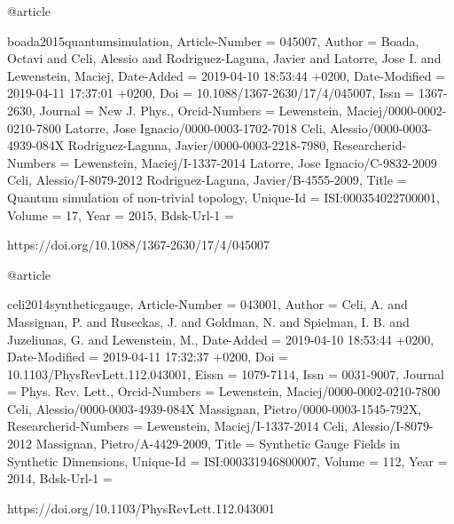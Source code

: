 \documentclass[epj,final]{svjour}
\begin{document}
{{{{{@article{boada2015quantumsimulation,
	Article-Number = {{045007}},
	Author = {Boada, Octavi and Celi, Alessio and Rodriguez-Laguna, Javier and Latorre, Jose I. and Lewenstein, Maciej},
	Date-Added = {2019-04-10 18:53:44 +0200},
	Date-Modified = {2019-04-11 17:37:01 +0200},
	Doi = {{10.1088/1367-2630/17/4/045007}},
	Issn = {{1367-2630}},
	Journal = {New J. Phys.},
	Orcid-Numbers = {{Lewenstein, Maciej/0000-0002-0210-7800 Latorre, Jose Ignacio/0000-0003-1702-7018 Celi, Alessio/0000-0003-4939-084X Rodriguez-Laguna, Javier/0000-0003-2218-7980}},
	Researcherid-Numbers = {{Lewenstein, Maciej/I-1337-2014 Latorre, Jose Ignacio/C-9832-2009 Celi, Alessio/I-8079-2012 Rodriguez-Laguna, Javier/B-4555-2009}},
	Title = {{Quantum simulation of non-trivial topology}},
	Unique-Id = {{ISI:000354022700001}},
	Volume = {{17}},
	Year = {{2015}},
	Bdsk-Url-1 = {https://doi.org/10.1088/1367-2630/17/4/045007

@article{celi2014syntheticgauge,
	Article-Number = {{043001}},
	Author = {Celi, A. and Massignan, P. and Ruseckas, J. and Goldman, N. and Spielman, I. B. and Juzeliunas, G. and Lewenstein, M.},
	Date-Added = {2019-04-10 18:53:44 +0200},
	Date-Modified = {2019-04-11 17:32:37 +0200},
	Doi = {{10.1103/PhysRevLett.112.043001}},
	Eissn = {{1079-7114}},
	Issn = {{0031-9007}},
	Journal = {Phys. Rev. Lett.},
	Orcid-Numbers = {{Lewenstein, Maciej/0000-0002-0210-7800 Celi, Alessio/0000-0003-4939-084X Massignan, Pietro/0000-0003-1545-792X}},
	Researcherid-Numbers = {{Lewenstein, Maciej/I-1337-2014 Celi, Alessio/I-8079-2012 Massignan, Pietro/A-4429-2009}},
	Title = {{Synthetic Gauge Fields in Synthetic Dimensions}},
	Unique-Id = {{ISI:000331946800007}},
	Volume = {{112}},
	Year = {{2014}},
	Bdsk-Url-1 = {https://doi.org/10.1103/PhysRevLett.112.043001

}}}}}}}}}
\end{document}
